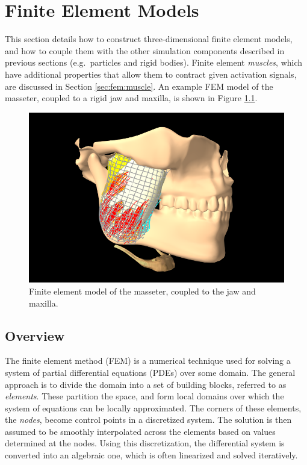 
\newlength{\imglength}
\newcommand{\setlengthLaTeXML}[3]{ %
	\iflatexml %
	\setlength{#1}{#2} %
	\else %
	\setlength{#1}{#3} %
	\fi %
}

\chapter{Finite Element Models}
\label{FEMModels:sec}

This section details how to construct three-dimensional finite element models,
and how to couple them with the other simulation components described in
previous sections (e.g.~particles and rigid bodies).  Finite element
\emph{muscles}, which have additional properties that allow them to contract
given activation signals, are discussed in Section \ref{sec:fem:muscle}.  An 
example FEM model of the masseter, coupled to a rigid jaw and maxilla, is shown 
in Figure \ref{fig:fem:masseter}.

\begin{figure}[ht]
	\centering
	\setlengthLaTeXML{\imglength}{0.8\textwidth}{0.6\textwidth}
	\includegraphics[width=\imglength]{images/fem_masseter}
	\caption{Finite element model of the masseter, coupled to the jaw and 
	         maxilla. \label{fig:fem:masseter}} 
\end{figure}

\section{Overview}
\label{sec:fem:overview}

The finite element method (FEM) is a numerical technique used for solving a 
system of partial differential equations (PDEs) over some domain.  The general
approach is to divide the domain into a set of building blocks, referred to
as \emph{elements}.  These partition the space, and form local domains over
which the system of equations can be locally approximated. The corners of these
elements, the \emph{nodes}, become control points in a discretized system.  
The solution is then assumed to be
smoothly interpolated across the elements based on values determined at the
nodes.  Using this discretization, the differential system is converted into 
an algebraic one, which is often linearized and solved iteratively.

